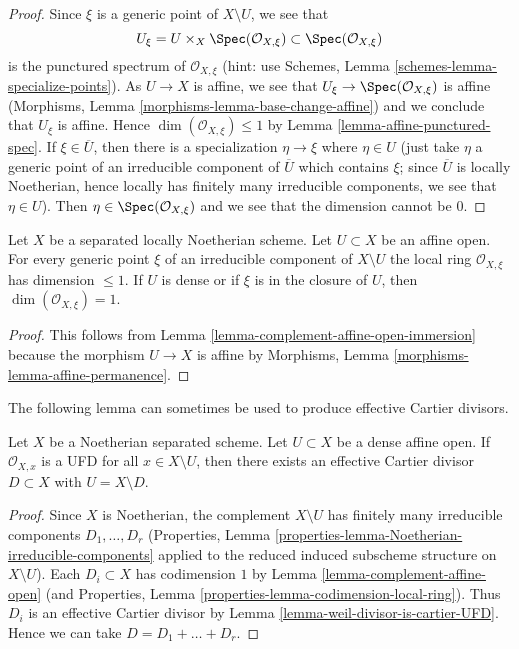 \begin{proof}
Since $\xi$ is a generic point of $X \setminus U$, we see that
$$
U_\xi = U \times_X \Spec(\mathcal{O}_{X, \xi}) \subset
\Spec(\mathcal{O}_{X, \xi})
$$
is the punctured spectrum of $\mathcal{O}_{X, \xi}$ (hint: use
Schemes, Lemma \ref{schemes-lemma-specialize-points}).
As $U \to X$ is affine, we see that $U_\xi \to \Spec(\mathcal{O}_{X, \xi})$
is affine (Morphisms, Lemma \ref{morphisms-lemma-base-change-affine})
and we conclude that $U_\xi$ is affine.
Hence $\dim(\mathcal{O}_{X, \xi}) \leq 1$ by
Lemma \ref{lemma-affine-punctured-spec}.
If $\xi \in \overline{U}$, then there is a specialization
$\eta \to \xi$ where $\eta \in U$ (just take $\eta$ a generic
point of an irreducible component of $\overline{U}$ which
contains $\xi$; since $\overline{U}$ is locally Noetherian,
hence locally has finitely many irreducible components, we see that
$\eta \in U$). Then $\eta \in \Spec(\mathcal{O}_{X, \xi})$ and
we see that the dimension cannot be $0$.
\end{proof}

\begin{lemma}
\label{lemma-complement-affine-open}
Let $X$ be a separated locally Noetherian scheme. Let $U \subset X$ be an
affine open. For every generic point $\xi$ of an irreducible component of
$X \setminus U$ the local ring $\mathcal{O}_{X, \xi}$
has dimension $\leq 1$. If $U$ is dense or if $\xi$ is in the closure
of $U$, then $\dim(\mathcal{O}_{X, \xi}) = 1$.
\end{lemma}

\begin{proof}
This follows from Lemma \ref{lemma-complement-affine-open-immersion}
because the morphism $U \to X$ is affine by
Morphisms, Lemma \ref{morphisms-lemma-affine-permanence}.
\end{proof}

\noindent
The following lemma can sometimes be used to produce effective
Cartier divisors.

\begin{lemma}
\label{lemma-complement-open-affine-effective-cartier-divisor}
Let $X$ be a Noetherian separated scheme. Let $U \subset X$ be
a dense affine open. If $\mathcal{O}_{X, x}$ is a UFD for all
$x \in X \setminus U$, then there exists an effective Cartier
divisor $D \subset X$ with $U = X \setminus D$.
\end{lemma}

\begin{proof}
Since $X$ is Noetherian, the complement $X \setminus U$ has finitely
many irreducible components $D_1, \ldots, D_r$
(Properties, Lemma \ref{properties-lemma-Noetherian-irreducible-components}
applied to the reduced induced subscheme structure on $X \setminus U$).
Each $D_i \subset X$ has codimension $1$ by
Lemma \ref{lemma-complement-affine-open}
(and Properties, Lemma \ref{properties-lemma-codimension-local-ring}).
Thus $D_i$ is an effective Cartier divisor by
Lemma \ref{lemma-weil-divisor-is-cartier-UFD}.
Hence we can take $D = D_1 + \ldots + D_r$.
\end{proof}

